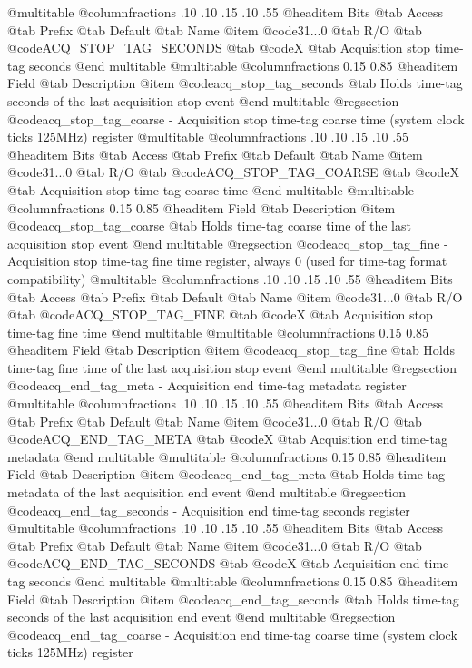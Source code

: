 @multitable @columnfractions .10 .10 .15 .10 .55
@headitem Bits @tab Access @tab Prefix @tab Default @tab Name
@item @code{31...0}
@tab R/O @tab
@code{ACQ_STOP_TAG_SECONDS}
@tab @code{X} @tab 
Acquisition stop time-tag seconds
@end multitable
@multitable @columnfractions 0.15 0.85
@headitem Field @tab Description
@item @code{acq_stop_tag_seconds} @tab Holds time-tag seconds of the last acquisition stop event
@end multitable
@regsection @code{acq_stop_tag_coarse} - Acquisition stop time-tag coarse time (system clock ticks 125MHz) register
@multitable @columnfractions .10 .10 .15 .10 .55
@headitem Bits @tab Access @tab Prefix @tab Default @tab Name
@item @code{31...0}
@tab R/O @tab
@code{ACQ_STOP_TAG_COARSE}
@tab @code{X} @tab 
Acquisition stop time-tag coarse time
@end multitable
@multitable @columnfractions 0.15 0.85
@headitem Field @tab Description
@item @code{acq_stop_tag_coarse} @tab Holds time-tag coarse time of the last acquisition stop event
@end multitable
@regsection @code{acq_stop_tag_fine} - Acquisition stop time-tag fine time register, always 0 (used for time-tag format compatibility)
@multitable @columnfractions .10 .10 .15 .10 .55
@headitem Bits @tab Access @tab Prefix @tab Default @tab Name
@item @code{31...0}
@tab R/O @tab
@code{ACQ_STOP_TAG_FINE}
@tab @code{X} @tab 
Acquisition stop time-tag fine time
@end multitable
@multitable @columnfractions 0.15 0.85
@headitem Field @tab Description
@item @code{acq_stop_tag_fine} @tab Holds time-tag fine time of the last acquisition stop event
@end multitable
@regsection @code{acq_end_tag_meta} - Acquisition end time-tag metadata register
@multitable @columnfractions .10 .10 .15 .10 .55
@headitem Bits @tab Access @tab Prefix @tab Default @tab Name
@item @code{31...0}
@tab R/O @tab
@code{ACQ_END_TAG_META}
@tab @code{X} @tab 
Acquisition end time-tag metadata
@end multitable
@multitable @columnfractions 0.15 0.85
@headitem Field @tab Description
@item @code{acq_end_tag_meta} @tab Holds time-tag metadata of the last acquisition end event
@end multitable
@regsection @code{acq_end_tag_seconds} - Acquisition end time-tag seconds register
@multitable @columnfractions .10 .10 .15 .10 .55
@headitem Bits @tab Access @tab Prefix @tab Default @tab Name
@item @code{31...0}
@tab R/O @tab
@code{ACQ_END_TAG_SECONDS}
@tab @code{X} @tab 
Acquisition end time-tag seconds
@end multitable
@multitable @columnfractions 0.15 0.85
@headitem Field @tab Description
@item @code{acq_end_tag_seconds} @tab Holds time-tag seconds of the last acquisition end event
@end multitable
@regsection @code{acq_end_tag_coarse} - Acquisition end time-tag coarse time (system clock ticks 125MHz) register
